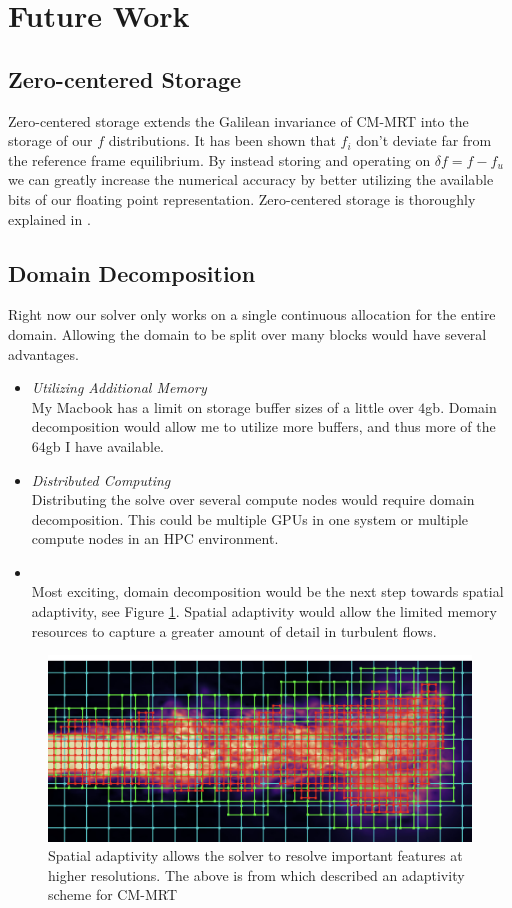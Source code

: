 \section{Future Work}\label{sec:futurework}

\subsection{Zero-centered Storage}
Zero-centered storage extends the Galilean invariance of CM-MRT 
into the storage of our $f$ distributions.
It has been shown that $f_i$ don't deviate far from the reference
frame equilibrium.
By instead storing and operating on $\delta f = f - f_u$ 
we can greatly increase the numerical accuracy by better
utilizing the available bits of our floating point representation.
Zero-centered storage is thoroughly explained in \cite{Hennig2023}.

\subsection{Domain Decomposition}
Right now our solver only works on a single continuous allocation
for the entire domain.
Allowing the domain to be split over many blocks would have several 
advantages.
\begin{itemize}
  \item \textit{Utilizing Additional Memory } \\
My Macbook has a limit on storage buffer sizes of a little over $4$gb.
Domain decomposition would allow me to utilize more buffers, and thus more of the $64$gb I have available.

  \item \textit{Distributed Computing} \\
Distributing the solve over several compute nodes would require 
domain decomposition. 
This could be multiple GPUs in one system or
multiple compute nodes in an HPC environment.

  \item {} \\
Most exciting, domain decomposition would be the next step towards spatial adaptivity, see Figure \ref{fig:adaptivity}. 
Spatial adaptivity would allow the limited memory resources to
capture a greater amount of detail in turbulent flows.
\end{itemize}
\begin{figure}
\label{fig:adaptivity}
\begin{center}
  \includegraphics[width=0.6\linewidth]{adaptivity.png}
\end{center}
\caption{Spatial adaptivity allows the solver to resolve important features at higher resolutions. The above is from \cite{Li2018} which described an adaptivity scheme for CM-MRT}
\end{figure}
